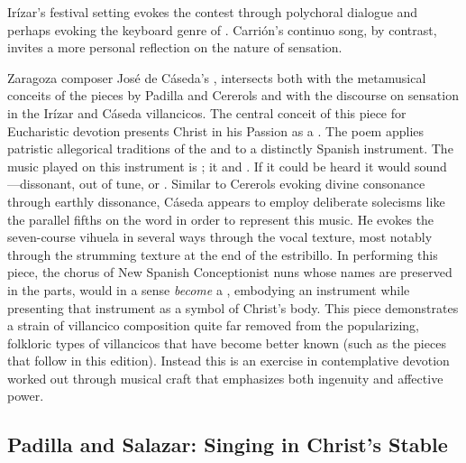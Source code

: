 Irízar's festival setting evokes the contest through polychoral dialogue and perhaps evoking the keyboard genre of .
Carrión's continuo song, by contrast, invites a more personal reflection on the nature of sensation.

Zaragoza composer José de Cáseda's , intersects both with the metamusical conceits of the pieces by Padilla and Cererols and with the discourse on sensation in the Irízar and Cáseda villancicos.
The central conceit of this piece for Eucharistic devotion presents Christ in his Passion as a .
The poem applies patristic allegorical traditions of the  and  to a distinctly Spanish instrument.
The music played on this instrument is ; it  and .
If it could be heard it would sound ---dissonant, out of tune, or . 
Similar to Cererols evoking divine consonance through earthly dissonance, Cáseda appears to employ deliberate solecisms like the parallel fifths on the word  in order to represent this  music.
He evokes the seven-course vihuela in several ways through the vocal texture, most notably through the strumming texture at the end of the estribillo.
In performing this piece, the chorus of New Spanish Conceptionist nuns whose names are preserved in the parts, would in a sense \emph{become} a , embodying an instrument while presenting that instrument as a symbol of Christ's body.
This piece demonstrates a strain of villancico composition quite far removed from the popularizing, folkloric types of villancicos that have become better known (such as the pieces that follow in this edition).
Instead this is an exercise in contemplative devotion worked out through musical craft that emphasizes both ingenuity and affective power.

\subsection{Padilla and Salazar: Singing in Christ's Stable}

